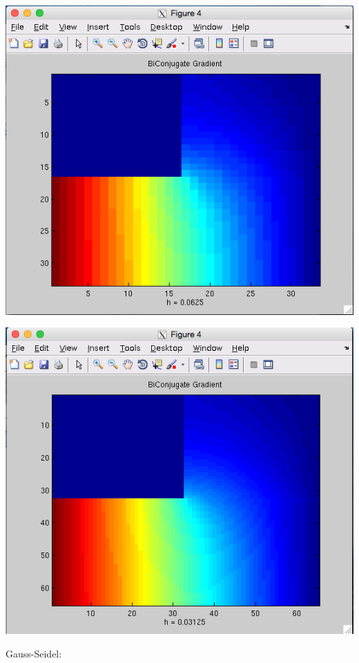\documentclass[11pt, oneside]{article}   	%
\begin{document}
\centerline{\includegraphics[scale = 0.55]{Biconjugate_h4.png}}

\centerline{\includegraphics[scale = 0.55]{Biconjugate_h5.png}}

Gauss-Seidel: \\
\end{document}
